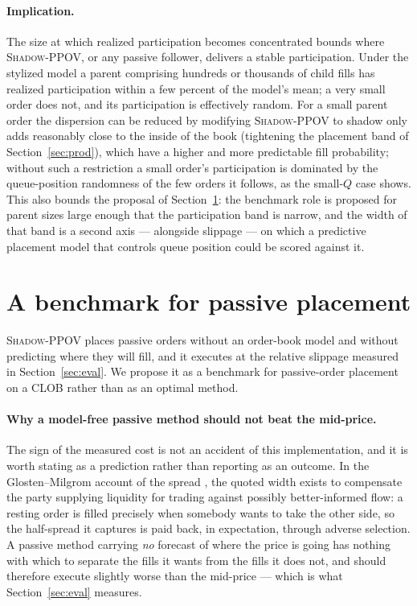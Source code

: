 \documentclass[11pt]{article}
\newcommand{\pov}{\textsc{Shadow-PPOV}}
\begin{document}
\paragraph{Implication.} The size at which realized participation becomes
concentrated bounds where \pov{}, or any passive follower, delivers a stable participation.
Under the stylized model a parent comprising hundreds or thousands of child fills
has realized participation within a few percent of the model's mean; a very small
order does not, and its participation is
effectively random. For a small parent order the dispersion
can be reduced by modifying \pov{} to shadow only adds reasonably close to the
inside of the book (tightening the placement band of Section~\ref{sec:prod}),
which have a higher and more predictable fill probability; without such a
restriction a small order's participation is dominated by the queue-position
randomness of the few orders it follows, as the small-$Q$ case shows.
This also bounds the proposal of
Section~\ref{sec:disc}: the benchmark role is proposed for parent sizes large
enough that the participation band is narrow, and the width of that band is a
second axis --- alongside slippage --- on which a predictive placement model
that controls queue position could be scored against it.

\section{A benchmark for passive placement}
\label{sec:disc}

\pov{} places passive orders
without an order-book model and without predicting where they will fill, and it
executes at the relative slippage measured in Section~\ref{sec:eval}. We propose
it as a benchmark for passive-order placement on a CLOB rather than as an
optimal method.

\paragraph{Why a model-free passive method should not beat the mid-price.}
The sign of the measured cost is not an accident of this implementation, and it
is worth stating as a prediction rather than reporting as an outcome. In the
Glosten--Milgrom account of the spread \cite{glostenmilgrom1985}, the quoted
width exists to compensate the party supplying liquidity for trading against
possibly better-informed flow: a resting order is filled precisely when somebody
wants to take the other side, so the half-spread it captures is paid back, in
expectation, through adverse selection. A passive method carrying \emph{no}
forecast of where the price is going has nothing with which to separate the
fills it wants from the fills it does not, and should therefore execute slightly
worse than the mid-price --- which is what Section~\ref{sec:eval} measures.
\end{document}
